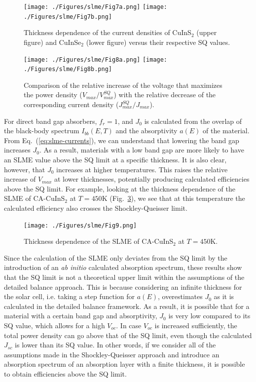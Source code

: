 \begin{refsection}
\begin{figure}[h]
	\centering
	\texttt{[image: ./Figures/slme/Fig7a.png]}
	\texttt{[image: ./Figures/slme/Fig7b.png]}	
	\caption{Thickness dependence of the current densities of CuInS$_2$ (upper figure) and CuInSe$_2$ (lower figure) versus their respective SQ values.}
	\label{fig:slme-J_L}
\end{figure}

\begin{figure}[h]
	\centering
		\texttt{[image: ./Figures/slme/Fig8a.png]}
		\texttt{[image: ./Figures/slme/Fig8b.png]}
	\caption{Comparison of the relative increase of the voltage that maximizes the power density ($V_{max}/V_{max}^{SQ}$) with the relative decrease of the corresponding current density ($J_{max}^{SQ}/J_{max}$).}
	\label{fig:slme-VJcomp}
\end{figure}

For direct band gap absorbers, $f_r = 1$, and $J_0$ is calculated from the overlap of the black-body spectrum $I_{bb}(E,T)$ and the absorptivity $a(E)$ of the material. From Eq.~(\ref{eq:slme-currents}), we can understand that lowering the band gap increases $J_0$. As a result, materials with a low band gap are more likely to have an SLME value above the SQ limit at a specific thickness. It is also clear, however, that $J_0$ increases at higher temperatures. This raises the relative increase of $V_{max}$ at lower thicknesses, potentially producing calculated efficiencies above the SQ limit. For example, looking at the thickness dependence of the SLME of CA-CuInS$_2$ at $T=450\si{\kelvin}$ (Fig.~\ref{fig:slme-SLME_highT}), we see that at this temperature the calculated efficiency also crosses the Shockley-Queisser limit. 

\begin{figure}[h]
	\centering
		\texttt{[image: ./Figures/slme/Fig9.png]}
	\caption{Thickness dependence of the SLME of CA-CuInS$_2$ at $T = 450$\si{\kelvin}.}
	\label{fig:slme-SLME_highT}
\end{figure}

Since the calculation of the SLME only deviates from the SQ limit by the introduction of an \textit{ab initio} calculated absorption spectrum, these results show that the SQ limit is not a theoretical upper limit within the assumptions of the detailed balance approach. This is because considering an infinite thickness for the solar cell, i.e. taking a step function for $a(E)$, overestimates $J_0$ as it is calculated in the detailed balance framework. As a result, it is possible that for a material with a certain band gap and absorptivity, $J_0$ is very low compared to its SQ value, which allows for a high $V_{oc}$. In case $V_{oc}$ is increased sufficiently, the total power density can go above that of the SQ limit, even though the calculated $J_{sc}$ is lower than its SQ value. In other words, if we consider all of the assumptions made in the Shockley-Queisser approach and introduce an absorption spectrum of an absorption layer with a finite thickness, it is possible to obtain efficiencies above the SQ limit.


\end{refsection}
